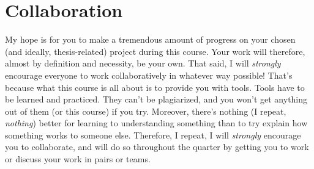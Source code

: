 \documentclass[10pt]{article}
\begin{document}
\section*{Collaboration}
My hope is for you to make a tremendous amount of progress on your chosen (and ideally, 
thesis-related) project during this course.
Your work will therefore, almost by definition and necessity, be your own.
That said, I will \textit{strongly} encourage everyone to work collaboratively in whatever way possible!
That's because what this course is all about is to provide you with tools.
Tools have to be learned and practiced.
They can't be plagiarized, and you won't get anything out of them (or this course) if you try.
Moreover, there's nothing (I repeat, \textit{nothing}) better for learning to understanding something than 
to try explain how something works to someone else.
Therefore, I repeat, I will \textit{strongly} encourage you to collaborate, and will do so throughout the 
quarter by getting you to work or discuss your work in pairs or teams.

\end{document}
